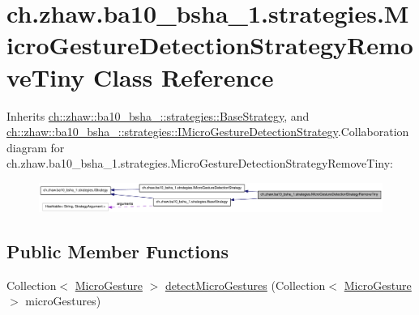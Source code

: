 \hypertarget{classch_1_1zhaw_1_1ba10__bsha__1_1_1strategies_1_1MicroGestureDetectionStrategyRemoveTiny}{
\section{ch.zhaw.ba10\_\-bsha\_\-1.strategies.MicroGestureDetectionStrategyRemoveTiny Class Reference}
\label{classch_1_1zhaw_1_1ba10__bsha__1_1_1strategies_1_1MicroGestureDetectionStrategyRemoveTiny}
}


Inherits \hyperlink{classch_1_1zhaw_1_1ba10__bsha__1_1_1strategies_1_1BaseStrategy}{ch::zhaw::ba10\_\-bsha\_::strategies::BaseStrategy}, and \hyperlink{interfacech_1_1zhaw_1_1ba10__bsha__1_1_1strategies_1_1IMicroGestureDetectionStrategy}{ch::zhaw::ba10\_\-bsha\_::strategies::IMicroGestureDetectionStrategy}.Collaboration diagram for ch.zhaw.ba10\_\-bsha\_\-1.strategies.MicroGestureDetectionStrategyRemoveTiny:\nopagebreak
\begin{figure}[H]
\begin{center}
\leavevmode
\includegraphics[width=400pt]{classch_1_1zhaw_1_1ba10__bsha__1_1_1strategies_1_1MicroGestureDetectionStrategyRemoveTiny__coll__graph}
\end{center}
\end{figure}
\subsection*{Public Member Functions}
\begin{DoxyCompactItemize}
\item 
Collection$<$ \hyperlink{classch_1_1zhaw_1_1ba10__bsha__1_1_1service_1_1MicroGesture}{MicroGesture} $>$ \hyperlink{classch_1_1zhaw_1_1ba10__bsha__1_1_1strategies_1_1MicroGestureDetectionStrategyRemoveTiny_a3a51833545b6e87173dbacf505e44359}{detectMicroGestures} (Collection$<$ \hyperlink{classch_1_1zhaw_1_1ba10__bsha__1_1_1service_1_1MicroGesture}{MicroGesture} $>$ microGestures)
\end{DoxyCompactItemize}

